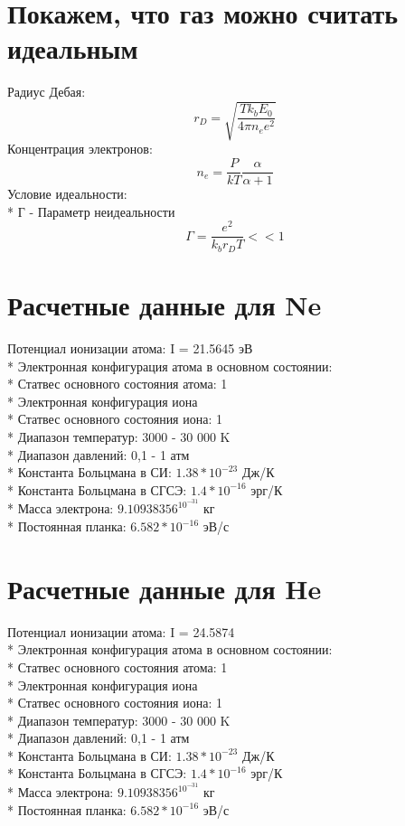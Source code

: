 \documentclass[letterpaper,12pt]{article} %
\begin{document}
\section{Покажем, что газ можно считать идеальным}
Радиус Дебая:
\begin{equation}
r_D=\sqrt{\frac{Tk_bE_0}{4\pi n_e e^2}}
\end{equation}
Концентрация электронов:
\begin{equation}
n_e=\frac{P}{kT} \frac{\alpha}{\alpha + 1}
\end{equation}
Условие идеальности:\\*
Г - Параметр неидеальности
\begin{equation}
\Gamma = \frac{e^2}{k_b r_D T}< < 1
\end{equation}

\section{Расчетные данные для Ne}
Потенциал ионизации атома: I = 21.5645 эВ
\\* Электронная конфигурация атома в основном состоянии: 
\\* Статвес основного состояния атома: 1
\\* Электронная конфигурация иона 
\\* Статвес основного состояния иона: 1
\\* Диапазон температур: 3000 - 30 000 K
\\* Диапазон давлений: 0,1 - 1 атм
\\* Константа Больцмана в СИ: $1.38*10^{-23}$ Дж/К
\\* Константа Больцмана в СГСЭ: $1.4*10^{-16}$ эрг/К
\\* Масса электрона: $9.10938356^10^{-31}$ кг
\\* Постоянная планка: $6.582*10^{-16}$ эВ/с

\section{Расчетные данные для He}
Потенциал ионизации атома: I = 24.5874 
\\* Электронная конфигурация атома в основном состоянии: 
\\* Статвес основного состояния атома: 1
\\* Электронная конфигурация иона 
\\* Статвес основного состояния иона: 1
\\* Диапазон температур: 3000 - 30 000 K
\\* Диапазон давлений: 0,1 - 1 атм
\\* Константа Больцмана в СИ: $1.38*10^{-23}$ Дж/К
\\* Константа Больцмана в СГСЭ: $1.4*10^{-16}$ эрг/К
\\* Масса электрона: $9.10938356^10^{-31}$ кг
\\* Постоянная планка: $6.582*10^{-16}$ эВ/с
\end{document}
